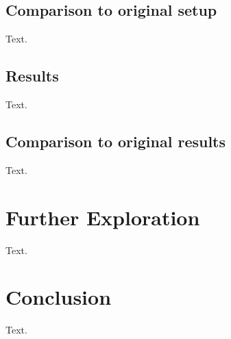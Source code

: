 \documentclass{article}
\begin{document}
\subsection{Comparison to original setup}
Text.

\subsection{Results}
Text.

\subsection{Comparison to original results}
Text.




\newpage
\section{Further Exploration}
Text.




\newpage
\section{Conclusion}
Text.





\newpage


\end{document}
